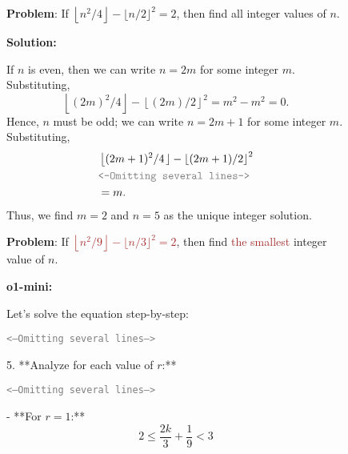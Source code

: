 \begin{figure*}[ht]
\begin{small}
    \centering
    \begin{minipage}[c]{0.54\textwidth}
        \begin{tcolorbox}[colback=white, colframe=gray!30, title=\textcolor{black}{\textsf{Original}}]
        \textbf{Problem}: If $\left\lfloor n^2/4 \right\rfloor - \lfloor n/2 \rfloor^2 = 2$, then find all integer values of $n$.
        
        \dashline
        
        \textbf{Solution:}
        
        If $n$ is even, then we can write $n = 2m$ for some integer $m$. Substituting, $$\left \lfloor (2m)^2/4 \right\rfloor - \left\lfloor (2m)/2 \right\rfloor^2 = m^2 - m^2 = 0.$$Hence, $n$ must be odd; we can write $n = 2m+1$ for some integer $m$. Substituting,   
        \begin{align*}
        &\left \lfloor (2m+1)^2/4 \right. \rfloor - \left\lfloor (2m+1)/2 \right\rfloor^2\\
        & \text{\textcolor{gray}{\texttt{<--Omitting several lines-->}}}\\
        & = m.
        \end{align*}Thus, we find $m = 2$ and $n = \boxed{5}$ as the unique integer solution.
        \vspace{1mm}
        \end{tcolorbox}
    \end{minipage}
    \hfill
    \begin{minipage}[c]{0.44\textwidth}
        \begin{tcolorbox}[colback=white, colframe=gray!30, title=\HARD]
            \textbf{Problem}: If \textcolor{brown}{$\left\lfloor n^2/9 \right\rfloor - \lfloor n/3 \rfloor^2 = 2$}, then find \textcolor{brown}{the smallest} integer value of $n$.

        \dashline

        \textbf{o1-mini:} 
        
        Let's solve the equation step-by-step:
        
        \textcolor{gray}{\texttt{<--Omitting several lines-->}}

5. **Analyze for each value of \(r\):**

    \textcolor{gray}{\texttt{<--Omitting several lines-->}}
    
   - **For \(r = 1\):**
     \[
     2 \leq \frac{2k}{3} + \frac{1}{9} < 3
     \]
     

\end{tcolorbox}
\end{minipage}
\end{small}
\end{figure*}
